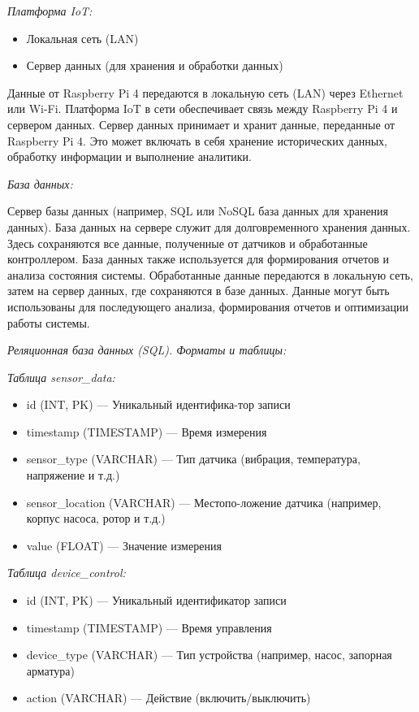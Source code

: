 \begin{multicols}{2}
\emph{Платформа IoT:}
  \begin{itemize}
    \setlength{\itemindent}{1cm}
\item
  Локальная сеть (LAN)
\item
  Сервер данных (для хранения и обработки данных)
\end{itemize}

Данные от Raspberry Pi 4 передаются в локальную сеть (LAN) через
Ethernet или Wi-Fi. Платформа IoT в сети обеспечивает связь между
Raspberry Pi 4 и сервером данных. Сервер данных принимает и хранит
данные, переданные от Raspberry Pi 4. Это может включать в себя хранение
исторических данных, обработку информации и выполнение аналитики.

\emph{База данных:}

Сервер базы данных (например, SQL или NoSQL база данных для хранения
данных). База данных на сервере служит для долговременного хранения
данных. Здесь сохраняются все данные, полученные от датчиков и
обработанные контроллером. База данных также используется для
формирования отчетов и анализа состояния системы. Обработанные данные
передаются в локальную сеть, затем на сервер данных, где сохраняются в
базе данных. Данные могут быть использованы для последующего анализа,
формирования отчетов и оптимизации работы системы.

\emph{Реляционная база данных (SQL). Форматы и таблицы:}

\emph{Таблица sensor\_data:}

\begin{itemize}
  \setlength{\itemindent}{1cm}

\item
  id (INT, PK) --- Уникальный идентифика-тор записи
\item
  timestamp (TIMESTAMP) --- Время измерения
\item
  sensor\_type (VARCHAR) --- Тип датчика (вибрация, температура,
  напряжение и т.д.)
\item
  sensor\_location (VARCHAR) --- Местопо-ложение датчика (например,
  корпус насоса, ротор и т.д.)
\item
  value (FLOAT) --- Значение измерения
\end{itemize}

\emph{Таблица device\_control:}

\begin{itemize}
  \setlength{\itemindent}{1cm}

\item
  id (INT, PK) --- Уникальный идентификатор записи
\item
  timestamp (TIMESTAMP) --- Время управления
\item
  device\_type (VARCHAR) --- Тип устройства (например, насос, запорная
  арматура)
\item
  action (VARCHAR) --- Действие (включить/выключить)
\end{itemize}


\end{multicols}
